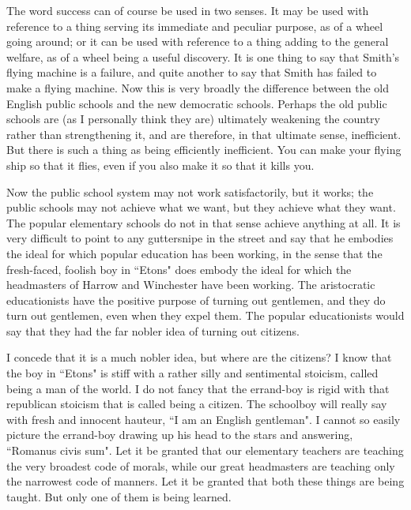 \documentclass[final,10pt,letterpaper,twocolumn,openany]{book}
\begin{document}
    The word success can of course be used in two senses. It may be used
with reference to a thing serving its immediate and peculiar purpose, as of
a wheel going around; or it can be used with reference to a thing adding to
the general welfare, as of a wheel being a useful discovery. It is one thing
to say that Smith's flying machine is a failure, and quite another to say that
Smith has failed to make a flying machine. Now this is very broadly the
difference between the old English public schools and the new democratic
schools. Perhaps the old public schools are (as I personally think they are)
ultimately weakening the country rather than strengthening it, and are
therefore, in that ultimate sense, inefficient. But there is such a thing as
being efficiently inefficient. You can make your flying ship so that it flies,
even if you also make it so that it kills you. 

Now the public school system
may not work satisfactorily, but it works; the public schools may not
achieve what we want, but they achieve what they want. The popular
elementary schools do not in that sense achieve anything at all. It is very
difficult to point to any guttersnipe in the street and say that he embodies
the ideal for which popular education has been working, in the sense that
the fresh-faced, foolish boy in ``Etons" does embody the ideal for which
the headmasters of Harrow and Winchester have been working. The
aristocratic educationists have the positive purpose of turning out
gentlemen, and they do turn out gentlemen, even when they expel them.
The popular educationists would say that they had the far nobler idea of
turning out citizens. 

I concede that it is a much nobler idea, but where are
the citizens? I know that the boy in ``Etons" is stiff with a rather silly and
sentimental stoicism, called being a man of the world. I do not fancy that
the errand-boy is rigid with that republican stoicism that is called being a
citizen. The schoolboy will really say with fresh and innocent hauteur, ``I
am an English gentleman". I cannot so easily picture the errand-boy
drawing up his head to the stars and answering, ``Romanus civis sum". Let
it be granted that our elementary teachers are teaching the very broadest
code of morals, while our great headmasters are teaching only the
narrowest code of manners. Let it be granted that both these things are
being taught. But only one of them is being learned.
\end{document}

